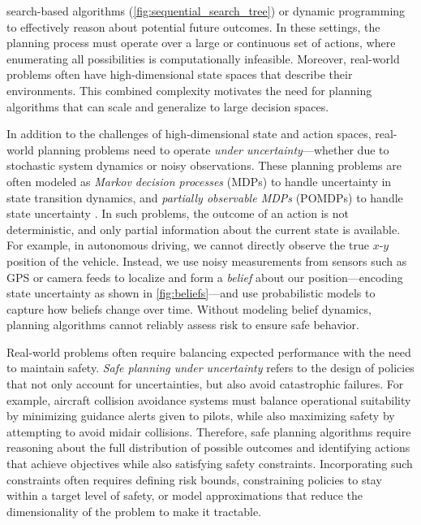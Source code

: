 search-based algorithms \cite{coulom2007efficient} (\cref{fig:sequential_search_tree}) or dynamic programming \cite{bellman1957dynamic} to effectively reason about potential future outcomes.
In these settings, the planning process must operate over a large or continuous set of actions, where enumerating all possibilities is computationally infeasible.
Moreover, real-world problems often have high-dimensional state spaces that describe their environments.
This combined complexity motivates the need for planning algorithms that can scale and generalize to large decision spaces.


In addition to the challenges of high-dimensional state and action spaces, real-world planning problems need to operate \textit{under uncertainty}---whether due to stochastic system dynamics or noisy observations.
These planning problems are often modeled as \textit{Markov decision processes} (MDPs) to handle uncertainty in state transition dynamics, and \textit{partially observable MDPs} (POMDPs) to handle state uncertainty \cite{dmbook}.
In such problems, the outcome of an action is not deterministic, and only partial information about the current state is available.
For example, in autonomous driving, we cannot directly observe the true $x$-$y$ position of the vehicle.
Instead, we use noisy measurements from sensors such as GPS or camera feeds to localize and form a \textit{belief} about our position---encoding state uncertainty as shown in \cref{fig:beliefs}---and use probabilistic models to capture how beliefs change over time.
Without modeling belief dynamics, planning algorithms cannot reliably assess risk to ensure safe behavior.


Real-world problems often require balancing expected performance with the need to maintain safety.
\textit{Safe planning under uncertainty} refers to the design of policies that not only account for uncertainties, but also avoid catastrophic failures.
For example, aircraft collision avoidance systems \cite{kochenderfer2012next} must balance operational suitability by minimizing guidance alerts given to pilots, while also maximizing safety by attempting to avoid midair collisions. 
Therefore, safe planning algorithms require reasoning about the full distribution of possible outcomes and identifying actions that achieve objectives while also satisfying safety constraints.
Incorporating such constraints often requires defining risk bounds, constraining policies to stay within a target level of safety, or model approximations that reduce the dimensionality of the problem to make it tractable.


